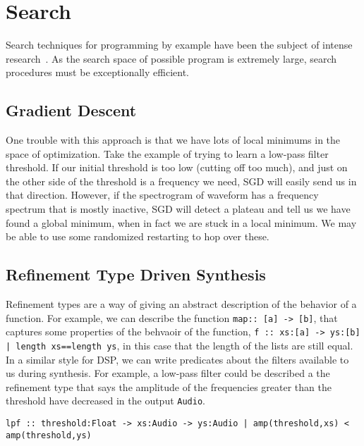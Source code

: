 \section{Search}

Search techniques for programming by example have been the subject of intense research~\cite{?,?,?}.
As the search space of possible program is extremely large, search procedures must be exceptionally efficient. 



\subsection{Gradient Descent}

One trouble with this approach is that we have lots of local minimums in the space of optimization.
Take the example of trying to learn a low-pass filter threshold.
If our initial threshold is too low (cutting off too much), and just on the other side of the threshold is a frequency we need, SGD will easily send us in that direction.
However, if the spectrogram of waveform has a frequency spectrum that is mostly inactive, SGD will detect a plateau and tell us we have found a global minimum, when in fact we are stuck in a local minimum.
We may be able to use some randomized restarting to hop over these.

\subsection{Refinement Type Driven Synthesis}

Refinement types are a way of giving an abstract description of the behavior of a function.
For example, we can describe the function \texttt{map:: [a] -> [b]}, that captures some properties of the behvaoir of the function, \texttt{f :: xs:[a] -> ys:[b] | length xs==length ys}, in this case that the length of the lists are still equal.
In a similar style for DSP, we can write predicates about the filters available to us during synthesis.
For example, a low-pass filter could be described a the refinement type that says the amplitude of the frequencies greater than the threshold have decreased in the output \texttt{Audio}.

\texttt{lpf :: threshold:Float -> xs:Audio -> ys:Audio | amp(threshold,xs) < amp(threshold,ys)}




